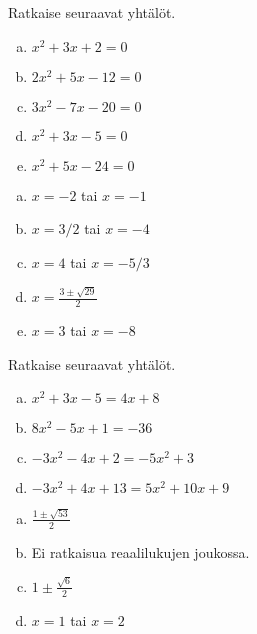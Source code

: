 \begin{tehtava}
    Ratkaise seuraavat yhtälöt.
    \begin{enumerate}[a)]
        \item $x^2+3x+2=0$
        \item $2x^2+5x-12=0$
        \item $3x^2-7x-20=0$
        \item $x^2+3x-5=0$
        \item $x^2+5x-24=0$
    \end{enumerate}
    \begin{vastaus}
        \begin{enumerate}[a)]
            \item $x=-2$ tai $x=-1$
            \item $x=3/2$ tai $x=-4$
            \item $x=4$ tai $x=-5/3$
            \item $x=\frac{3\pm\sqrt{29}}{2}$
            \item $x=3$ tai $x=-8$
        \end{enumerate}
    \end{vastaus}
\end{tehtava}

\begin{tehtava}
    Ratkaise seuraavat yhtälöt.
    \begin{enumerate}[a)]
        \item $x^2+3x-5=4x+8$
        \item $8x^2-5x+1=-36$
        \item $-3x^2-4x+2=-5x^2+3$
        \item $-3x^2+4x+13=5x^2+10x+9$
    \end{enumerate}
    \begin{vastaus}
        \begin{enumerate}[a)]
            \item $\frac{1\pm\sqrt{53}}{2}$
            \item Ei ratkaisua reaalilukujen joukossa.
            \item $1\pm\frac{\sqrt{6}}{2}$
            \item $x=1$ tai $x=2$
        \end{enumerate}
    \end{vastaus}
\end{tehtava}

